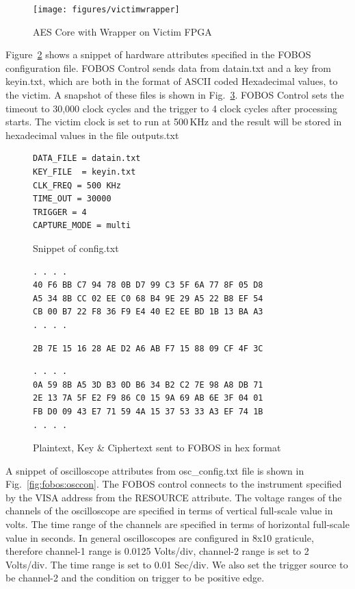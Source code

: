 \documentclass{llncs}
\numberwithin{algorithm}{chapter}
\begin{document}
\begin{figure}[ht]
\begin{center}
\texttt{[image: figures/victimwrapper]}
\caption{\label{fig:fobos-vicaes128}AES Core with Wrapper on Victim FPGA}
\end{center} 
\vspace{-3ex}
\end{figure}

Figure~\ref{fig:fobos-hardattb} shows a snippet of hardware attributes
specified in the FOBOS configuration file. FOBOS Control sends data from datain.txt 
and a key from keyin.txt, which are both in
the format of ASCII coded Hexadecimal values, to the victim. A snapshot of these files
is shown in Fig.~\ref{fig:fobos-iof}. FOBOS Control sets the timeout
to 30,000 clock cycles and the trigger to 4 clock cycles after processing starts.
The victim clock is set to run at 500\,KHz and the result will be 
stored in hexadecimal values in the file outputs.txt

\begin{figure}[ht]
\begin{Verbatim}[frame=single]
DATA_FILE = datain.txt
KEY_FILE  = keyin.txt
CLK_FREQ = 500 KHz 
TIME_OUT = 30000
TRIGGER = 4
CAPTURE_MODE = multi
\end{Verbatim}
\caption{\label{fig:fobos-hardattb}Snippet of config.txt}
\end{figure}


\begin{figure}[H]
\begin{Verbatim}[frame=single]
. . . .
40 F6 BB C7 94 78 0B D7 99 C3 5F 6A 77 8F 05 D8 
A5 34 8B CC 02 EE C0 68 B4 9E 29 A5 22 B8 EF 54 
CB 00 B7 22 F8 36 F9 E4 40 E2 EE BD 1B 13 BA A3
. . . .
\end{Verbatim}
\begin{Verbatim}[frame=single]
2B 7E 15 16 28 AE D2 A6 AB F7 15 88 09 CF 4F 3C
\end{Verbatim}
\begin{Verbatim}[frame=single]
. . . .
0A 59 8B A5 3D B3 0D B6 34 B2 C2 7E 98 A8 DB 71 
2E 13 7A 5F E2 F9 86 C0 15 9A 69 AB 6E 3F 04 01 
FB D0 09 43 E7 71 59 4A 15 37 53 33 A3 EF 74 1B 
. . . .
\end{Verbatim}
\caption{\label{fig:fobos-iof}Plaintext, Key \& Ciphertext sent to FOBOS in hex format}
\end{figure}

A snippet of oscilloscope attributes from osc\_config.txt file is shown in Fig.~\ref{fig:fobos:osccon}.
The FOBOS control connects to the instrument specified by the VISA address from the RESOURCE attribute.
The voltage ranges of the channels of the oscilloscope are specified in terms of vertical full-scale 
value in volts. The time range of the channels are specified in terms of horizontal full-scale
value in seconds. In general oscilloscopes are configured in 8x10 graticule, therefore channel-1 range 
is 0.0125 Volts/div, channel-2 range is set to 2 Volts/div. The time range is set to 0.01 Sec/div. We also set
the trigger source to be channel-2 and the condition on trigger to be positive edge.
\end{document}
